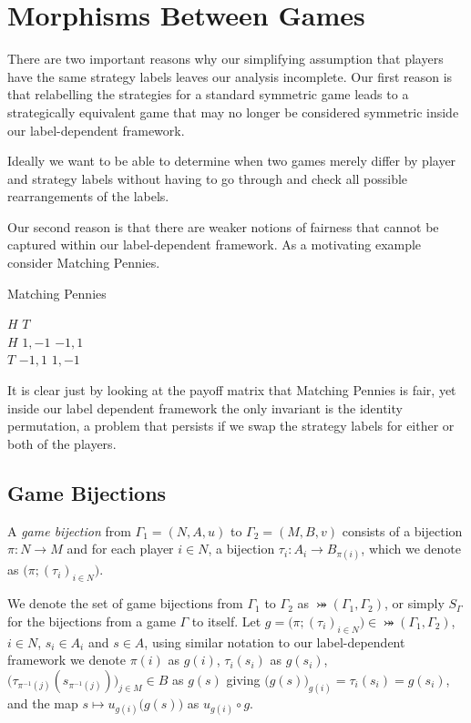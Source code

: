 \section{Morphisms Between Games} \label{sec:morphisms}
There are two important reasons why our simplifying assumption that players have the same strategy labels leaves our analysis incomplete. Our first reason is that relabelling the strategies for a standard symmetric game leads to a strategically equivalent game that may no longer be considered symmetric inside our label-dependent framework. 

Ideally we want to be able to determine when two games merely differ by player and strategy labels without having to go through and check all possible rearrangements of the labels.

Our second reason is that there are weaker notions of fairness that cannot be captured within our label-dependent framework. As a motivating example consider Matching Pennies.

\begin{example} \label{MPeg}
	Matching Pennies
	\begin{center}
		\begin{game}{2}{2}
			      \> $H$    \> $T$ \\
			$H$   \> $1,-1$  \> $-1,1$ \\
			$T$   \> $-1,1$  \> $1,-1$
		\end{game} 
	\end{center}
	It is clear just by looking at the payoff matrix that Matching Pennies is fair, yet inside our label dependent framework the only invariant is the identity permutation, a problem that persists if we swap the strategy labels for either or both of the players.             
\end{example}

\subsection{Game Bijections}    
	\begin{definition}
		A \textit{game bijection} from $\Gamma_1 = (N, A, u)$ to $\Gamma_2 = (M, B, v)$ consists of a bijection $\pi:N\rightarrow M$ and for each player $i \in N$, a bijection $\tau_i:A_i\rightarrow B_{\pi(i)}$, which we denote as $\bigl(\pi; (\tau_i)_{i \in N}\bigr)$.
	\end{definition}
	
	We denote the set of game bijections from $\Gamma_1$ to $\Gamma_2$ as $\bij(\Gamma_1, \Gamma_2)$, or simply $S_{\Gamma}$ for the bijections from a game $\Gamma$ to itself. Let $g = \bigl(\pi; (\tau_i)_{i \in N}\bigr) \in \bij(\Gamma_1, \Gamma_2)$, $i \in N$, $s_i \in A_i$ and $s \in A$, using similar notation to our label-dependent framework we denote $\pi(i)$ as $g(i)$, $\tau_i(s_i)$ as $g(s_i)$, $\bigl(\tau_{\pi^{-1}(j)}(s_{\pi^{-1}(j)})\bigr)_{j \in M} \in B$ as $g(s)$ giving $\bigl(g(s)\bigr)_{g(i)} = \tau_i(s_i) = g(s_i)$, and the map $s \mapsto u_{g(i)}\bigl(g(s)\bigr)$ as $u_{g(i)} \circ g$. 	
	
